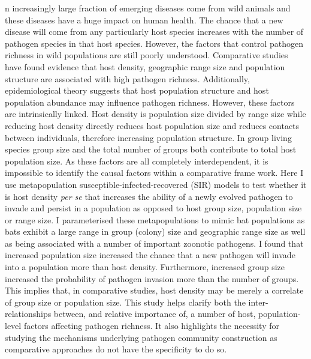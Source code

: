 n increasingly large fraction of emerging diseases come from wild animals and these diseases have a huge impact on human health.
The chance that a new disease will come from any particularly host species increases with the number of pathogen species in that host species.
However, the factors that control pathogen richness in wild populations are still poorly understood.
Comparative studies have found evidence that host density, geographic range size and population structure are associated with high pathogen richness. 
Additionally, epidemiological theory suggests that host population structure and host population abundance may influence pathogen richness.
However, these factors are intrinsically linked.
Host density is population size divided by range size while reducing host density directly reduces host population size and reduces contacts between individuals, therefore increasing population structure.
In group living species group size and the total number of groups both contribute to total host population size. 
As these factors are all completely interdependent, it is impossible to identify the causal factors within a comparative frame work.
Here I use metapopulation susceptible-infected-recovered (SIR) models to test whether it is host density \emph{per se} that increases the ability of a newly evolved pathogen to invade and persist in a population as opposed to host group size, population size or range size.
I parameterised these metapopulations to mimic bat populations as bats exhibit a large range in group (colony) size and geographic range size as well as being associated with a number of important zoonotic pathogens.
I found that increased population size increased the chance that a new pathogen will invade into a population more than host density.
Furthermore, increased group size increased the probability of pathogen invasion more than the number of groups.
This implies that, in comparative studies, host density may be merely a correlate of group size or population size.
This study helps clarify both the inter-relationships between, and relative importance of, a number of host, population-level factors affecting pathogen richness. 
It also highlights the necessity for studying the mechanisms underlying pathogen community construction as comparative approaches do not have the specificity to do so.



